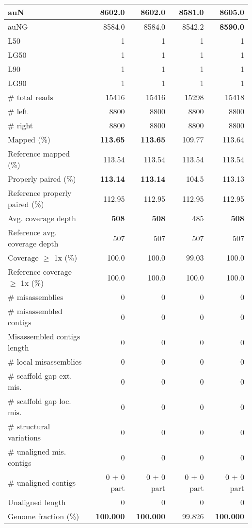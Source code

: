 \documentclass[12pt,a4paper]{article}
\begin{document}
\begin{table}[ht]
\begin{center}
\begin{tabular}{|l*{4}{|r}|}
auN & 8602.0 & 8602.0 & 8581.0 & {\bf 8605.0} \\ \hline
auNG & 8584.0 & 8584.0 & 8542.2 & {\bf 8590.0} \\ \hline
L50 & 1 & 1 & 1 & 1 \\ \hline
LG50 & 1 & 1 & 1 & 1 \\ \hline
L90 & 1 & 1 & 1 & 1 \\ \hline
LG90 & 1 & 1 & 1 & 1 \\ \hline
\# total reads & 15416 & 15416 & 15298 & 15418 \\ \hline
\# left & 8800 & 8800 & 8800 & 8800 \\ \hline
\# right & 8800 & 8800 & 8800 & 8800 \\ \hline
Mapped (\%) & {\bf 113.65} & {\bf 113.65} & 109.77 & 113.64 \\ \hline
Reference mapped (\%) & 113.54 & 113.54 & 113.54 & 113.54 \\ \hline
Properly paired (\%) & {\bf 113.14} & {\bf 113.14} & 104.5 & 113.13 \\ \hline
Reference properly paired (\%) & 112.95 & 112.95 & 112.95 & 112.95 \\ \hline
Avg. coverage depth & {\bf 508} & {\bf 508} & 485 & {\bf 508} \\ \hline
Reference avg. coverage depth & 507 & 507 & 507 & 507 \\ \hline
Coverage $\geq$ 1x (\%) & 100.0 & 100.0 & 99.03 & 100.0 \\ \hline
Reference coverage $\geq$ 1x (\%) & 100.0 & 100.0 & 100.0 & 100.0 \\ \hline
\# misassemblies & 0 & 0 & 0 & 0 \\ \hline
\# misassembled contigs & 0 & 0 & 0 & 0 \\ \hline
Misassembled contigs length & 0 & 0 & 0 & 0 \\ \hline
\# local misassemblies & 0 & 0 & 0 & 0 \\ \hline
\# scaffold gap ext. mis. & 0 & 0 & 0 & 0 \\ \hline
\# scaffold gap loc. mis. & 0 & 0 & 0 & 0 \\ \hline
\# structural variations & 0 & 0 & 0 & 0 \\ \hline
\# unaligned mis. contigs & 0 & 0 & 0 & 0 \\ \hline
\# unaligned contigs & 0 + 0 part & 0 + 0 part & 0 + 0 part & 0 + 0 part \\ \hline
Unaligned length & 0 & 0 & 0 & 0 \\ \hline
Genome fraction (\%) & {\bf 100.000} & {\bf 100.000} & 99.826 & {\bf 100.000} \\ \hline

\end{tabular}
\end{center}
\end{table}
\end{document}
